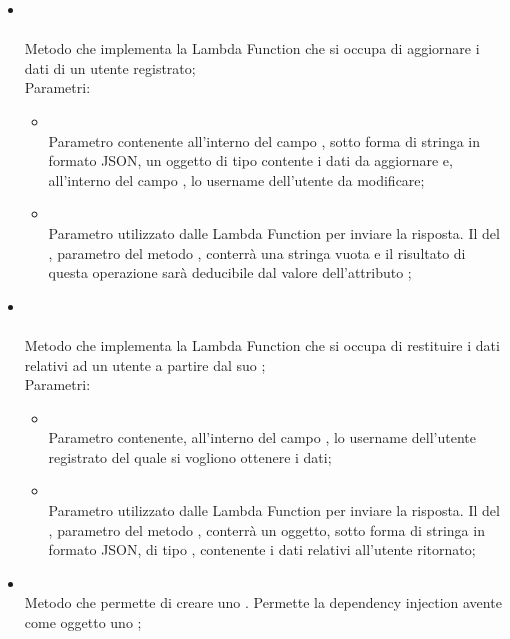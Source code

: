 \begin{itemize}
\begin{itemize}
\begin{itemize}
		\end{itemize}
		\item[] \\ \\		Metodo che implementa la Lambda Function che si occupa di aggiornare i dati di un utente registrato;\\
		Parametri:
		\begin{itemize}
			\item {} \\
			Parametro contenente all'interno del campo , sotto forma di stringa in formato JSON, un oggetto di tipo  contente i dati da aggiornare e, all'interno del campo , lo username dell'utente da modificare;
			\item {} \\
			Parametro utilizzato dalle Lambda Function per inviare la risposta. Il  del , parametro del metodo , conterrà una stringa vuota e il risultato di questa operazione sarà deducibile dal valore dell'attributo ;
		\end{itemize}
		\item[]  \\\\		Metodo che implementa la Lambda Function che si occupa di restituire i dati relativi ad un utente a partire dal suo ;\\
		Parametri:
		\begin{itemize}
			\item {} \\
			Parametro contenente, all'interno del campo , lo username dell'utente registrato del quale si vogliono ottenere i dati;
			\item {} \\
			Parametro utilizzato dalle Lambda Function per inviare la risposta. Il  del , parametro del metodo , conterrà un oggetto, sotto forma di stringa in formato JSON, di tipo , contenente i dati relativi all'utente ritornato;
		\end{itemize}
		\item[]  \\		Metodo che permette di creare uno . Permette la dependency injection avente come oggetto uno ;\\

\end{itemize}
\end{itemize}
